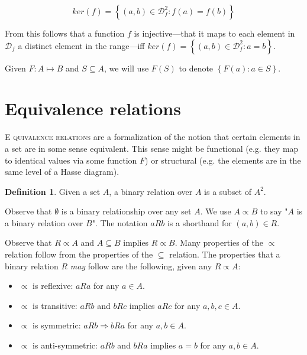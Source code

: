 \documentclass[a4paper, 12pt]{article}
\theoremstyle{definition}
\theoremstyle{definition}
\theoremstyle{definition}
\newtheorem{definition}{Definition}
\begin{document}
\begin{equation*}
    ker(f) = \left\{ (a, b) \in \mathcal{D}_f^2 : f(a) = f(b) \right\} 
\end{equation*}

From this follows that a function $f$ is injective---that it maps to each element
in $\mathcal{D}_f$ a distinct element in the range---iff $ker(f) =
\left\{ (a, b) \in \mathcal{D}_f^2 : a = b \right\} $.

Given $F : A \mapsto B$ and $S \subseteq A$, we will use $F(S)$ to denote
$\left\{ F(a) : a \in S \right\} $.


\pagebreak
{}
\section{Equivalence relations}

\lettrine{E}{ quivalence relations} are a formalization of the notion 
that certain elements in a set are in some sense equivalent. This 
sense might be functional (e.g. they map to identical values via some 
function $F$) or structural (e.g. the elements are in the same level of 
a Hasse diagram).

\begin{definition}
    Given a set $A$, a binary relation over $A$ is a subset of $A^2$.
\end{definition}

Observe that $\emptyset$ is a binary relationship over any set $A$. We use $A
\propto B$ to say "$A$ is a binary relation over $B$". The notation $aRb$ is a
shorthand for $(a, b) \in R$.

Observe that $R \propto A$ and $A \subseteq B$ implies $R \propto B$. Many
properties of the $\propto $ relation follow from the properties of the $\subseteq $
relation. The properties that a binary relation $R$ \textit{may} follow are the
following, given any $R \propto A$:

\begin{itemize}
    \item $\propto $ is reflexive: $aRa$ for any $a \in A$.
    \item $\propto $ is transitive: $aRb$ and $bRc$ implies $aRc$ for any $a, b,
        c \in A$.
    \item $\propto $ is symmetric: $aRb \Rightarrow bRa$ for any $a, b \in A$.
    \item $\propto $ is anti-symmetric: $aRb$ and $bRa$ implies $a = b$ for any
        $a, b \in A$.
\end{itemize}
\end{document}
